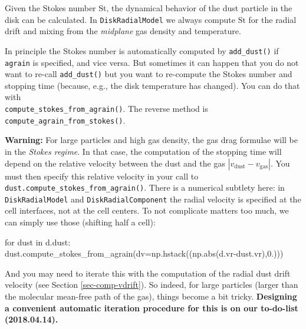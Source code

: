 \documentclass{book}
\newcommand{\code}[1]{{\small\tt #1}}
\begin{document}
Given the Stokes number $\mathrm{St}$, the dynamical behavior of the dust particle in
the disk can be calculated. In \code{DiskRadialModel} we always compute $\mathrm{St}$
for the radial drift and mixing from the {\em midplane} gas density and temperature.

In principle the Stokes number is automatically computed by \code{add\_dust()} if
\code{agrain} is specified, and vice versa. But sometimes it can happen that you
do not want to re-call \code{add\_dust()} but you want to re-compute the Stokes
number and stopping time (because, e.g., the disk temperature has changed). You
can do that with\\ \code{compute\_stokes\_from\_agrain()}. The reverse method is
\code{compute\_agrain\_from\_stokes()}.

{\bf Warning:} For large particles and high gas density, the gas drag formulae
will be in the {\em Stokes regime}. In that case, the computation of the
stopping time will depend on the relative velocity between the dust and the gas
$|v_{\mathrm{dust}}-v_{\mathrm{gas}}|$. You must then specify this relative velocity
in your call to \code{dust.compute\_stokes\_from\_agrain()}. There is a numerical
subtlety here: in \code{DiskRadialModel} and \code{DiskRadialComponent} the radial velocity
is specified at the cell interfaces, not at the cell centers. To not complicate
matters too much, we can simply use those (shifting half a cell):
\begin{codebox}
for dust in d.dust:
    dust.compute_stokes_from_agrain(dv=np.hstack((np.abs(d.vr-dust.vr),0.)))
\end{codebox}
And you may need to iterate this with the computation of the radial dust drift
velocity (see Section \ref{sec-comp-vdrift}). So indeed, for large particles
(larger than the molecular mean-free path of the gas), things become a bit
tricky. {\bf Designing a convenient automatic iteration procedure for this is on
  our to-do-list (2018.04.14).}
\end{document}
